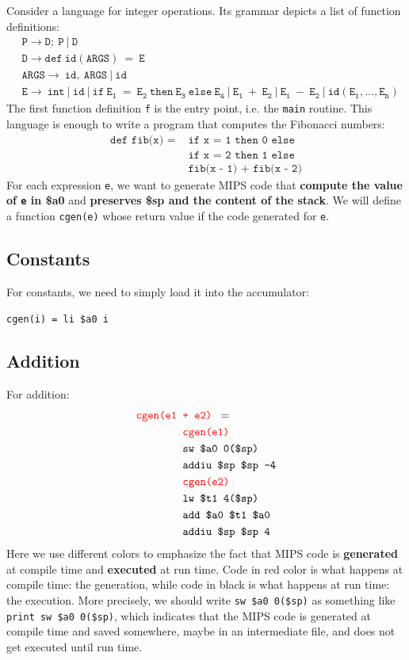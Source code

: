 Consider a language for integer operations. Its grammar depicts a list of function definitions:
\begin{align*}
&\mathtt{P\rightarrow D;\:P\:|\:D}\\
&\mathtt{D\rightarrow def\:id(ARGS)\:=\:E}\\
&\mathtt{ARGS\rightarrow\:id,\:ARGS\:|\:id}\\
&\mathtt{E\rightarrow\:int\:|\:id\:|\:if\:E_1\:=\:E_2\:then\:E_3\:else\:E_4\:|\:E_1\:+\:E_2\:|\:E_1\:-\:E_2\:|\:id(E_1,\dots,E_n)}
\end{align*}
The first function definition \texttt{f} is the entry point, i.e. the \texttt{main} routine. This language is enough to write a program that computes the Fibonacci numbers:
\begin{equation}\label{fibonacci}\begin{split}
\texttt{def fib(x) = }&\texttt{if x = 1 then 0 else}\\
&\texttt{if x = 2 then 1 else}\\
&\texttt{fib(x - 1) + fib(x - 2)}
\end{split}\end{equation}
For each expression \texttt{e}, we want to generate MIPS code that \textbf{compute the value of \texttt{e} in \$a0} and \textbf{preserves \$sp and the content of the stack}. We will define a function \texttt{cgen(e)} whose return value if the code generated for \texttt{e}.

\subsection{Constants}
For constants, we need to simply load it into the accumulator:
\begin{center}
\texttt{\color{red}cgen(i)}\texttt{ = li \$a0 i}
\end{center}
\subsection{Addition}
For addition:
\begin{align*}
\texttt{\color{red}cgen(e1 }&\texttt{\color{red}+ e2) }=\\
&\texttt{\color{red}cgen(e1)}\\
&\texttt{sw \$a0 0(\$sp)}\\
&\texttt{addiu \$sp \$sp -4}\\
&\texttt{\color{red} cgen(e2)}\\
&\texttt{lw \$t1 4(\$sp)}\\
&\texttt{add \$a0 \$t1 \$a0}\\
&\texttt{addiu \$sp \$sp 4}
\end{align*}
Here we use different colors to emphasize the fact that MIPS code is \textbf{generated} at compile time and \textbf{executed} at run time. Code in red color is what happens at compile time: the generation, while code in black is what happens at run time: the execution. More precisely, we should write \texttt{sw \$a0 0(\$sp)} as something like \texttt{{\color{red}print} sw \$a0 0(\$sp)}, which indicates that the MIPS code is generated at compile time and saved somewhere, maybe in an intermediate file, and does not get executed until run time.

